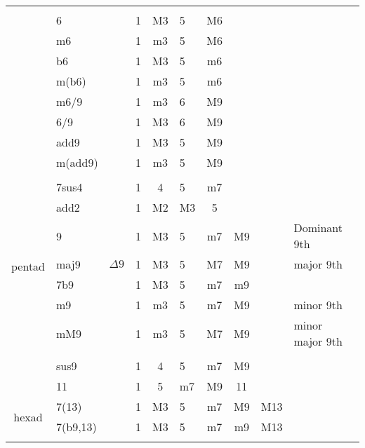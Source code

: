 \begin{table*}[!h]
\begin{tabular}{clccclcccl}
		\hline \vspace{-0.2cm} \\
							   & 6       & & 1 & M3  & 5 & M6   &   & \\
                               & m6      & & 1 & m3  & 5 & M6   &   & \\
							   & b6      & & 1 & M3  & 5 & m6   &   & \\
                               & m(b6)     & & 1 & m3  & 5 & m6   &   & \\
		                       & m6/9   & & 1 & m3  & 6 & M9  &   & \\
		                       & 6/9    & & 1 & M3  & 6 & M9  &   & \\
		                       & add9    & & 1 & M3  & 5 & M9  &   & \\
		  					   & m(add9) & & 1 & m3  & 5 & M9  &   & \\
		\hline  \vspace{-0.2cm} \\
							   & 7sus4   & & 1 & 4   & 5 & m7  &  & \\
		                       & add2    & & 1 & M2  & M3& 5   &  & \\
		\hline
		\multirow{4}{*}{pentad}& 9     & & 1 & M3  & 5 & m7  & M9  & & Dominant 9th \\
	                           & maj9  &$\Delta9$  & 1 & M3  & 5 & M7  & M9  & & major 9th \\
		                       & 7b9 & & 1 & M3  & 5 & m7  & m9  &\\
		                       & m9    & & 1 & m3  & 5 & m7  & M9  & & minor 9th \\
							   & mM9    & & 1 & m3  & 5 & M7  & M9  & & minor major 9th\\
		\hline  \vspace{-0.2cm} \\
		                       & sus9  & & 1 & 4   & 5 & m7  & M9  & \\
		                       & 11    & & 1 & 5   & m7& M9  & 11  & \\ %
		\hline
		\multirow{2}{*}{hexad} & 7(13)     & & 1 & M3  & 5 & m7  & M9  & M13\\ %
		                       & 7(b9,13)  & & 1 & M3  & 5 & m7  & m9  & M13\\
		\hline \vspace{-0.2cm}
	\end{tabular}
	\label{tab: }
\end{table*}